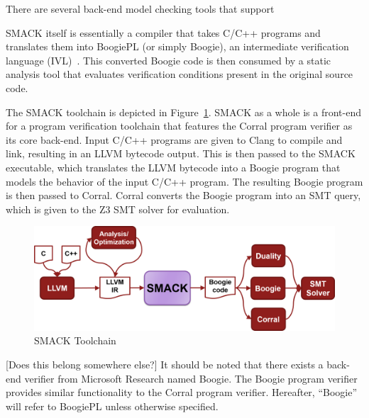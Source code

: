 \message{ !name(thesis.tex)}\documentclass[11pt,Chicago]{uuthesis}
\begin{document}
There are several back-end model checking tools that support 

SMACK itself is essentially a compiler that takes C/C++ programs and translates them into BoogiePL (or simply Boogie), an intermediate verification language (IVL)~\cite{smack}.  This converted Boogie code is then consumed by a static analysis tool that evaluates verification conditions present in the original source code.

The SMACK toolchain is depicted in Figure~\ref{fig:SMACKToolchain}.  SMACK as a whole is a front-end for a program verification toolchain that features the Corral program verifier as its core back-end.  Input C/C++ programs are given to Clang to compile and link, resulting in an LLVM bytecode output.  This is then passed to the SMACK executable, which translates the LLVM bytecode into a Boogie program that models the behavior of the input C/C++ program.  The resulting Boogie program is then passed to Corral.  Corral converts the Boogie program into an SMT query, which is given to the Z3 SMT solver for evaluation.

\begin{figure}[h]
  \caption{SMACK Toolchain}
  \label{fig:SMACKToolchain}
  \includegraphics[width=1\textwidth]{SmackToolchain.png}
\end{figure}

[Does this belong somewhere else?] It should be noted that there exists a back-end verifier from Microsoft Research named Boogie.  The Boogie program verifier provides similar functionality to the Corral program verifier.  Hereafter, ``Boogie'' will refer to BoogiePL unless otherwise specified.
\end{document}
